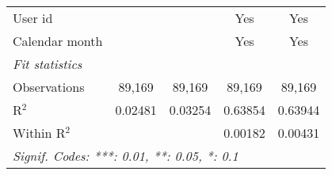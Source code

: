 \begin{table}[htbp]
\begin{threeparttable}[b]
\begin{tabular}{lcccc}
         User id             &                  &                  & Yes                   & Yes\\  
         Calendar month      &                  &                  & Yes                   & Yes\\  
         \midrule
         \emph{Fit statistics}\\
         Observations        & 89,169           & 89,169           & 89,169                & 89,169\\  
         R$^2$               & 0.02481          & 0.03254          & 0.63854               & 0.63944\\  
         Within R$^2$        &                  &                  & 0.00182               & 0.00431\\  
         \midrule \midrule
         \multicolumn{5}{l}{\emph{Signif. Codes: ***: 0.01, **: 0.05, *: 0.1}}\\
      \end{tabular}
   \end{threeparttable}
\end{table}


